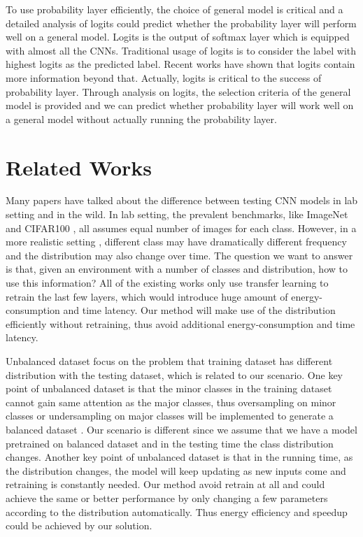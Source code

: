 \documentclass{article}
\begin{document}
To use probability layer efficiently, the choice of general model is critical and a detailed analysis of logits could predict whether the probability layer will perform well on a general model. Logits is the output of softmax layer which is equipped with almost all the CNNs. Traditional usage of logits is to consider the label with highest logits as the predicted label. Recent works \cite{ba2014deep, bucilua2006model, hinton2015distilling, lopez2015unifying} have shown that logits contain more information beyond that. Actually, logits is critical to the success of probability layer. Through analysis on logits, the selection criteria of the general model is provided and we can predict whether probability layer will work well on a general model without actually running the probability layer.

\section{Related Works}
Many papers have talked about the difference between testing CNN models in lab setting and in the wild. In lab setting, the prevalent benchmarks, like ImageNet \cite{deng2009imagenet} and CIFAR100 \cite{krizhevsky2009learning}, all assumes equal number of images for each class. However, in a more realistic setting \cite{han2016mcdnn, shen2017fast}, different class may have dramatically different frequency and the distribution may also change over time. The question we want to answer is that, given an environment with a number of classes and distribution, how to use this information? All of the existing works \cite{han2016mcdnn, shen2017fast} only use transfer learning to retrain the last few layers, which would introduce huge amount of energy-consumption and time latency. Our method will make use of the distribution efficiently without retraining, thus avoid additional energy-consumption and time latency.

Unbalanced dataset focus on the problem that training dataset has different distribution with the testing dataset, which is related to our scenario. One key point of unbalanced dataset is that the minor classes in the training dataset cannot gain same attention as the major classes, thus oversampling on minor classes or undersampling on major classes will be implemented to generate a balanced dataset \cite{wang2016dealing}. Our scenario is different since we assume that we have a model pretrained on balanced dataset and in the testing time the class distribution changes. Another key point of unbalanced dataset is that in the running time, as the distribution changes, the model will keep updating as new inputs come and retraining is constantly needed. Our method avoid retrain at all and could achieve the same or better performance by only changing a few parameters according to the distribution automatically. Thus energy efficiency and speedup could be achieved by our solution.
\end{document}

